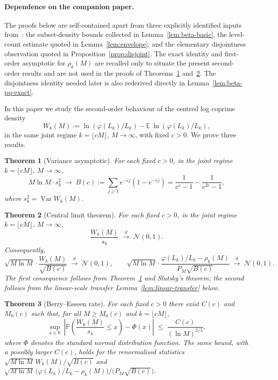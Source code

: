 \documentclass[11pt]{article}
\newtheorem{theorem}{Theorem}
\theoremstyle{remark}
\newcommand{\PP}{\mathbb{P}}
\newcommand{\EE}{\mathbb{E}}
\newcommand{\NN}{\mathcal{N}}
\newcommand{\RR}{\mathbb{R}}
\DeclareMathOperator{\Var}{Var}
\begin{document}
\paragraph{Dependence on the companion paper.}
The proofs below are self-contained apart from three explicitly identified inputs from~\cite{wakid1}: the subset-density bounds collected in Lemma~\ref{lem:beta-basic}, the level-count estimate quoted in Lemma~\ref{lem:envelope}, and the elementary disjointness observation quoted in Proposition~\ref{prop:disjoint}. The exact identity and first-order asymptotic for $\rho_k(M)$ are recalled only to situate the present second-order results and are not used in the proofs of Theorems~\ref{thm:variance} and~\ref{thm:CLT}. The disjointness identity needed later is also rederived directly in Lemma~\ref{lem:beta-pq-exact}.

In this paper we study the second-order behaviour of the centred log coprime density
\[
W_k(M) := \ln(\varphi(L_k)/L_k) - \EE\,\ln(\varphi(L_k)/L_k),
\]
in the same joint regime $k = \lfloor cM \rfloor$, $M \to \infty$, with fixed $c > 0$. We prove three results.

\begin{theorem}[Variance asymptotic]\label{thm:variance}
For each fixed $c > 0$, in the joint regime $k = \lfloor cM \rfloor$, $M \to \infty$,
\begin{equation}\label{eq:variance-limit}
M \ln M \cdot s_k^2 \;\longrightarrow\; B(c) := \sum_{j \geq 1} e^{-cj}(1 - e^{-cj}) = \frac{1}{e^c - 1} - \frac{1}{e^{2c} - 1},
\end{equation}
where $s_k^2 = \Var W_k(M)$.
\end{theorem}

\begin{theorem}[Central limit theorem]\label{thm:CLT}
For each fixed $c > 0$, in the joint regime $k = \lfloor cM \rfloor$, $M \to \infty$,
\[
\frac{W_k(M)}{s_k} \;\xrightarrow{d}\; \NN(0, 1).
\]
Consequently,
\[
\sqrt{M \ln M} \cdot \frac{W_k(M)}{\sqrt{B(c)}} \;\xrightarrow{d}\; \NN(0, 1),
\qquad
\sqrt{M \ln M} \cdot \frac{\varphi(L_k)/L_k - \rho_k(M)}{P_M \sqrt{B(c)}} \;\xrightarrow{d}\; \NN(0, 1).
\]
The first consequence follows from Theorem~\ref{thm:variance} and Slutsky's theorem; the second follows from the linear-scale transfer Lemma~\ref{lem:linear-transfer} below.
\end{theorem}

\begin{theorem}[Berry--Esseen rate]\label{thm:BE}
For each fixed $c > 0$ there exist $C(c)$ and $M_0(c)$ such that, for all $M \geq M_0(c)$ and $k = \lfloor cM \rfloor$,
\[
\sup_{x \in \RR}\, \left| \PP\!\left( \frac{W_k(M)}{s_k} \leq x \right) - \Phi(x) \right| \;\leq\; \frac{C(c)}{(\ln M)^{2/5}},
\]
where $\Phi$ denotes the standard normal distribution function. The same bound, with a possibly larger $C(c)$, holds for the renormalised statistics $\sqrt{M \ln M}\, W_k(M)/\sqrt{B(c)}$ and $\sqrt{M \ln M}\, \bigl(\varphi(L_k)/L_k - \rho_k(M)\bigr) \big/ \bigl(P_M \sqrt{B(c)}\bigr)$.
\end{theorem}
\end{document}
